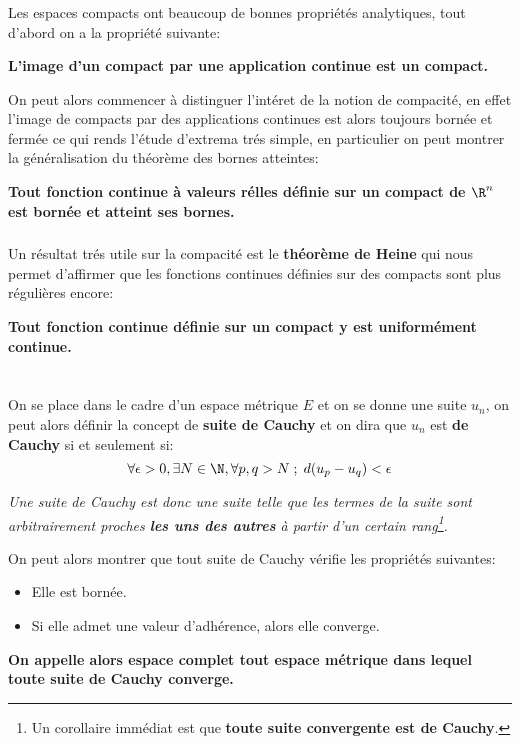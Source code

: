 \subsection*{}
Les espaces compacts ont beaucoup de bonnes propriétés analytiques, tout d'abord on a la propriété suivante:
\begin{center}
   \textbf{L'image d'un compact par une application continue est un compact.}
\end{center}
On peut alors commencer à distinguer l'intéret de la notion de compacité, en effet l'image de compacts par des applications continues est alors toujours bornée et fermée ce qui rends l'étude d'extrema trés simple, en particulier on peut montrer la généralisation du théorème des bornes atteintes:
\begin{center}
   \textbf{Tout fonction continue à valeurs rélles définie sur un compact de \(\R^n\) est bornée et atteint ses bornes.}
\end{center}
\subsection*{}
Un résultat trés utile sur la compacité est le \textbf{théorème de Heine} qui nous permet d'affirmer que les fonctions continues définies sur des compacts sont plus régulières encore:
\begin{center}
   \textbf{Tout fonction continue définie sur un compact y est uniformément continue.}
\end{center}

\chapter*{}

On se place dans le cadre d'un espace métrique \(E\) et on se donne une suite \(u_n\), on peut alors définir la concept de \textbf{suite de Cauchy} et on dira que \(u_n\) est \textbf{de Cauchy} si et seulement si:
\[
   \forall \epsilon > 0 , \exists N \in \N , \forall p, q > N \; ; \; d(u_p - u_q) < \epsilon
\] 
\begin{center}
   \textit{
       Une suite de Cauchy est donc une suite telle que les termes de la suite sont arbitrairement proches \textbf{les uns des autres} à partir d'un certain rang\footnote[1]{Un corollaire immédiat est que \textbf{toute suite convergente est de Cauchy}.}.
   }
\end{center}
On peut alors montrer que tout suite de Cauchy vérifie les propriétés suivantes:
\begin{itemize}
   \item Elle est bornée.
   \item Si elle admet une valeur d'adhérence, alors elle converge.
\end{itemize}
\begin{center}
   \textbf{On appelle alors espace complet tout espace métrique dans lequel toute suite de Cauchy converge.}
\end{center}